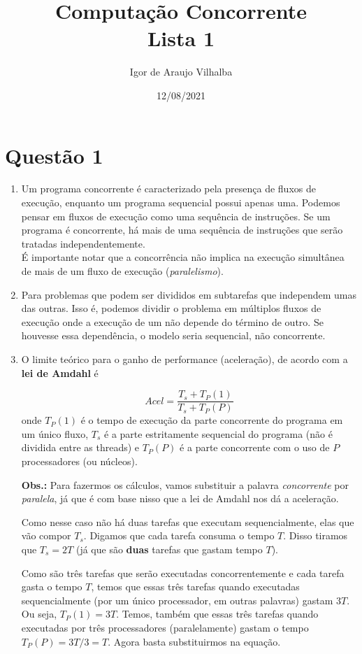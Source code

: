 \documentclass{article}
\title{\Large \textbf{Computação Concorrente}
	\vspace{0.5em}\\
	\large Lista 1
}
\author{Igor de Araujo Vilhalba}
\date{12/08/2021}
\begin{document}
\maketitle

\section*{Questão 1}

\begin{enumerate}[label=\textbf{\alph*)}]
	\item Um programa concorrente é caracterizado pela presença de fluxos de execução,
		enquanto um programa sequencial possui apenas uma. Podemos pensar em fluxos
		de execução como uma sequência de instruções. Se um programa é concorrente,
		há mais de uma sequência de instruções que serão tratadas independentemente.\\
		É importante notar que a concorrência não implica na execução simultânea de
		mais de um fluxo de execução (\emph{paralelismo}).
	\item Para problemas que podem ser divididos em subtarefas que independem umas das
		outras. Isso é, podemos dividir o problema em múltiplos fluxos de execução
		onde a execução de um não depende do término de outro. Se houvesse essa
		dependência, o modelo seria sequencial, não concorrente.
	\item O limite teórico para o ganho de performance (aceleração), de acordo com
		a \textbf{lei de Amdahl} é
		\begin{center}
			$$
			Acel = \frac{T_s + T_P(1)}{T_s+T_P(P)}
			$$
			onde $T_P(1)$ é o tempo de execução da parte concorrente do programa
			em um único fluxo, $T_s$ é a parte estritamente sequencial do programa
			(não é dividida entre as threads) e $T_P(P)$ é a parte concorrente com
			o uso de $P$ processadores (ou núcleos).
		\end{center}

		{\footnotesize \textbf{Obs.:} Para fazermos os cálculos, vamos substituir a palavra
		\emph{concorrente} por \emph{paralela}, já que é com base nisso que a lei de Amdahl
		nos dá a aceleração.}

		Como nesse caso não há duas tarefas que executam sequencialmente, elas que vão compor
		$T_s$. Digamos que cada tarefa consuma o tempo $T$. Disso tiramos que $T_s = 2T$ (já que
		são \textbf{duas} tarefas que gastam tempo $T$).


		Como são três tarefas que serão executadas concorrentemente e cada tarefa gasta o tempo $T$,
		temos que essas três tarefas quando executadas sequencialmente (por um único processador,
		em outras palavras) gastam $3T$. Ou seja, $T_P(1) = 3T$. Temos, também que essas três tarefas
		quando executadas por três processadores (paralelamente) gastam o tempo $T_P(P) = 3T/3 = T$.
		Agora basta substituirmos na equação.


\end{enumerate}
\end{document}
